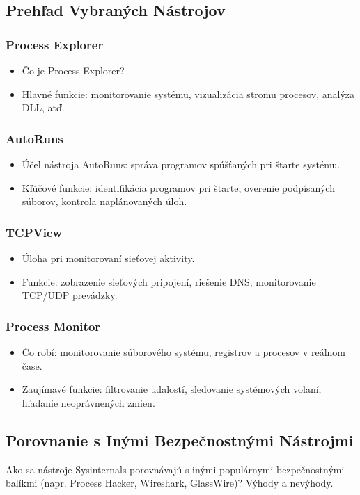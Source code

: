 \documentclass[conference]{IEEEtran}
\begin{document}
\subsection{Prehľad Vybraných Nástrojov}
\subsubsection{Process Explorer}
\begin{itemize}
    \item Čo je Process Explorer?
    \item Hlavné funkcie: monitorovanie systému, vizualizácia stromu procesov, analýza DLL, atď.
\end{itemize}

\subsubsection{AutoRuns}
\begin{itemize}
    \item Účel nástroja AutoRuns: správa programov spúšťaných pri štarte systému.
    \item Kľúčové funkcie: identifikácia programov pri štarte, overenie podpísaných súborov, kontrola naplánovaných úloh.
\end{itemize}

\subsubsection{TCPView}
\begin{itemize}
    \item Úloha pri monitorovaní sieťovej aktivity.
    \item Funkcie: zobrazenie sieťových pripojení, riešenie DNS, monitorovanie TCP/UDP prevádzky.
\end{itemize}

\subsubsection{Process Monitor}
\begin{itemize}
    \item Čo robí: monitorovanie súborového systému, registrov a procesov v reálnom čase.
    \item Zaujímavé funkcie: filtrovanie udalostí, sledovanie systémových volaní, hľadanie neoprávnených zmien.
\end{itemize}

\subsection{Porovnanie s Inými Bezpečnostnými Nástrojmi}
Ako sa nástroje Sysinternals porovnávajú s inými populárnymi bezpečnostnými balíkmi (napr. Process Hacker, Wireshark, GlassWire)? Výhody a nevýhody.
\end{document}
